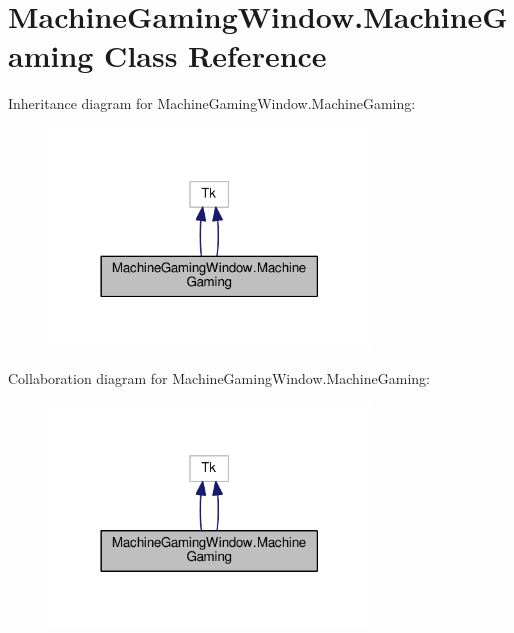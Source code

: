 \hypertarget{classMachineGamingWindow_1_1MachineGaming}{}\section{Machine\+Gaming\+Window.\+Machine\+Gaming Class Reference}
\label{classMachineGamingWindow_1_1MachineGaming}


Inheritance diagram for Machine\+Gaming\+Window.\+Machine\+Gaming\+:
\nopagebreak
\begin{figure}[H]
\begin{center}
\leavevmode
\includegraphics[width=242pt]{classMachineGamingWindow_1_1MachineGaming__inherit__graph}
\end{center}
\end{figure}


Collaboration diagram for Machine\+Gaming\+Window.\+Machine\+Gaming\+:
\nopagebreak
\begin{figure}[H]
\begin{center}
\leavevmode
\includegraphics[width=242pt]{classMachineGamingWindow_1_1MachineGaming__coll__graph}
\end{center}
\end{figure}
